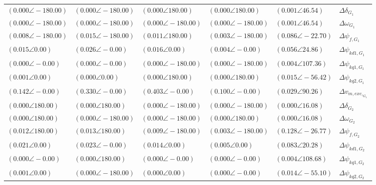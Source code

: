 \begin{tabular}{lllll|l}
$(0.000 \angle -180.00)$	& $(0.000 \angle -180.00)$	& $(0.000 \angle 180.00)$	& $(0.000 \angle 180.00)$	& $(0.001 \angle 46.54)$	& $\Delta\delta_{G_1}$ \\ 
$(0.000 \angle -180.00)$	& $(0.000 \angle -180.00)$	& $(0.000 \angle -180.00)$	& $(0.000 \angle -180.00)$	& $(0.001 \angle 46.54)$	& $\Delta\omega_{G_1}$ \\ 
$(0.008 \angle -180.00)$	& $(0.015 \angle -180.00)$	& $(0.011 \angle 180.00)$	& $(0.003 \angle -180.00)$	& $\mathbf{(0.086 \angle -22.70)}$	& $\Delta \psi_{f,G_1}$ \\ 
$(0.015 \angle 0.00)$	& $(0.026 \angle -0.00)$	& $(0.016 \angle 0.00)$	& $(0.004 \angle -0.00)$	& $\mathbf{(0.056 \angle 24.86)}$	& $\Delta \psi_{kd1,G_1}$ \\ 
$(0.000 \angle -0.00)$	& $(0.000 \angle -0.00)$	& $(0.000 \angle -180.00)$	& $(0.000 \angle -180.00)$	& $(0.004 \angle 107.36)$	& $\Delta \psi_{kq1,G_1}$ \\ 
$(0.001 \angle 0.00)$	& $(0.000 \angle 0.00)$	& $(0.000 \angle 180.00)$	& $(0.000 \angle 180.00)$	& $(0.015 \angle -56.42)$	& $\Delta \psi_{kq2,G_1}$ \\ 
$\mathbf{(0.142 \angle -0.00)}$	& $\mathbf{(0.330 \angle -0.00)}$	& $\mathbf{(0.403 \angle -0.00)}$	& $\mathbf{(0.100 \angle -0.00)}$	& $(0.029 \angle 90.26)$	& $\Delta v_{m,exc,_{G_1}}$ \\ 
 \hline 
$(0.000 \angle 180.00)$	& $(0.000 \angle 180.00)$	& $(0.000 \angle -180.00)$	& $(0.000 \angle -180.00)$	& $(0.000 \angle 16.08)$	& $\Delta\delta_{G_2}$ \\ 
$(0.000 \angle 180.00)$	& $(0.000 \angle -180.00)$	& $(0.000 \angle -180.00)$	& $(0.000 \angle 180.00)$	& $(0.000 \angle 16.08)$	& $\Delta\omega_{G_2}$ \\ 
$(0.012 \angle 180.00)$	& $(0.013 \angle 180.00)$	& $(0.009 \angle -180.00)$	& $(0.003 \angle -180.00)$	& $\mathbf{(0.128 \angle -26.77)}$	& $\Delta \psi_{f,G_2}$ \\ 
$(0.021 \angle 0.00)$	& $(0.023 \angle -0.00)$	& $(0.014 \angle 0.00)$	& $(0.005 \angle 0.00)$	& $\mathbf{(0.083 \angle 20.28)}$	& $\Delta \psi_{kd1,G_2}$ \\ 
$(0.000 \angle -0.00)$	& $(0.000 \angle 180.00)$	& $(0.000 \angle -0.00)$	& $(0.000 \angle -0.00)$	& $(0.004 \angle 108.68)$	& $\Delta \psi_{kq1,G_2}$ \\ 
$(0.001 \angle 0.00)$	& $(0.000 \angle -180.00)$	& $(0.000 \angle 0.00)$	& $(0.000 \angle -0.00)$	& $(0.014 \angle -55.10)$	& $\Delta \psi_{kq2,G_2}$ \\ 

\end{tabular}
